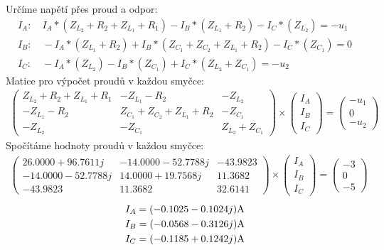 Určíme napětí přes proud a odpor:
\begin{gather*}
I_A: \quad I_A*(Z_{L_2} + R_2 + Z_{L_1} + R_1) - I_B*(Z_{L_1} + R_2) - I_C*(Z_{L_2}) = -u_1\\
I_B: \quad -I_A*(Z_{L_1} + R_2) + I_B*(Z_{C_1} + Z_{C_2} + Z_{L_1} + R_2) - I_C*(Z_{C_1}) = 0\\
I_C: \quad -I_A*(Z_{L_2}) - I_B*(Z_{C_1}) + I_C*(Z_{L_2} + Z_{C_1}) = -u_2
\end{gather*}
Matice pro výpočet proudů v každou smyčce: 
\begin{gather*}
\begin{pmatrix}
Z_{L_2}+R_2+Z_{L_1}+R_1 & -Z_{L_1}-R_2 & -Z_{L_2} \\
-Z_{L_1}-R_2 & Z_{C_1}+Z_{C_2}+Z_{L_1}+R_2 & -Z_{C_1} \\
-Z_{L_2} & -Z_{C_1} & Z_{L_2}+Z_{C_1}
\end{pmatrix}
\times
\begin{pmatrix}
I_A\\
I_B\\
I_C
\end{pmatrix}
=
\begin{pmatrix}
-u_1\\
0\\
-u_2
\end{pmatrix}
\end{gather*}
Spočítáme hodnoty proudů v každou smyčce:
\begin{gather*}
\begin{pmatrix}
26.0000+96.7611j & -14.0000-52.7788j & -43.9823 \\
-14.0000-52.7788j & 14.0000+19.7568j & 11.3682 \\
-43.9823 & 11.3682 & 32.6141
\end{pmatrix}
\times
\begin{pmatrix}
I_A\\
I_B\\
I_C
\end{pmatrix}
=
\begin{pmatrix}
-3\\
0\\
-5
\end{pmatrix}
\end{gather*}
\begin{gather*}
I_A = (-0.1025 - 0.1024j) \Am \\
I_B = (-0.0568 - 0.3126j) \Am \\
I_C = (-0.1185 + 0.1242j) \Am
\end{gather*}
